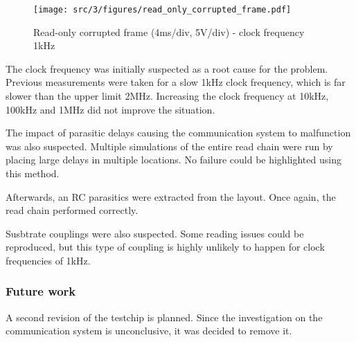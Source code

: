 \begin{figure}[!h]
  \centering
  \texttt{[image: src/3/figures/read\_only\_corrupted\_frame.pdf]}
  \caption{Read-only corrupted frame (4ms/div, 5V/div) - clock frequency 1kHz}
  \label{fig:read-only-full-frame}
\end{figure}

The clock frequency was initially suspected as a root cause for the problem.
Previous measurements were taken for a slow 1kHz clock frequency, which is far slower than the upper limit 2MHz.
Increasing the clock frequency at 10kHz, 100kHz and 1MHz did not improve the situation.

The impact of parasitic delays causing the communication system to malfunction was also suspected.
Multiple simulations of the entire read chain were run by placing large delays in multiple locations.
No failure could be highlighted using this method.

Afterwards, an RC parasitics were extracted from the layout.
Once again, the read chain performed correctly.

Susbtrate couplings were also suspected.
Some reading issues could be reproduced, but this type of coupling is highly unlikely to happen for clock frequencies of 1kHz.

\subsubsection{Future work}

A second revision of the testchip is planned.
Since the investigation on the communication system is unconclusive, it was decided to remove it.
